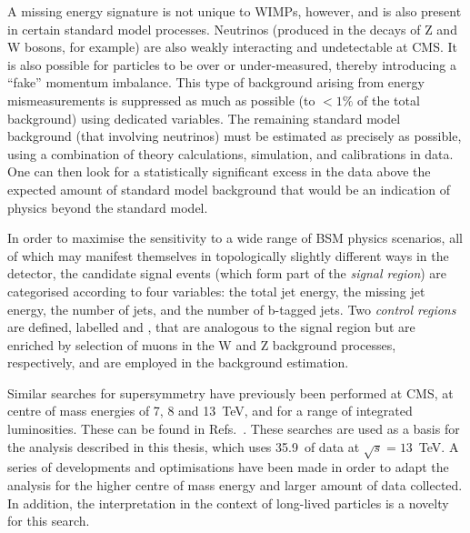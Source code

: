 A missing energy signature is not unique to WIMPs, however, and is also present 
in certain standard model processes. Neutrinos (produced in the decays of Z and 
W bosons, for example) are also weakly interacting and undetectable at CMS. It 
is also possible for particles to be over or under-measured, thereby 
introducing a ``fake'' momentum imbalance. This type of background arising from 
energy mismeasurements is suppressed as much as possible (to $<1\%$ of the 
total background) using dedicated variables. %
The remaining standard 
model background (that involving neutrinos) must be estimated as precisely as 
possible, using a combination of theory calculations, simulation, and 
calibrations in data. %
One can then look for a 
statistically significant excess in the data above the expected amount of 
standard model background that would be an indication of %
physics beyond the standard model. %

In order to maximise the sensitivity to a wide range of BSM physics %
scenarios, 
all of which may manifest themselves in topologically slightly different ways 
in the detector, the candidate signal events (which form part of the 
\textit{signal region}) are categorised according to four variables: the total 
jet energy, the missing jet energy, the number of jets, and the number of 
b-tagged jets. %
Two \textit{control regions} are defined, labelled \mj and 
\mmj, that are analogous to the signal region but are enriched by 
selection of muons in the W and Z background processes, respectively, and are 
employed in the background estimation.%

Similar searches for supersymmetry have previously been performed %
at CMS, at centre of mass energies of 7, 8 and 13~TeV, and for a range of 
integrated luminosities. These can be found in 
Refs.~\cite{alphat1,alphat2,alphat3,alphat4,alphat5}. These 
searches are used as a basis for the analysis described in this thesis, which 
uses 35.9~\ifb of data at $\sqrt{s}=13$~TeV. A 
series of developments and optimisations have been made in order to adapt the 
analysis for the higher centre of mass energy and larger amount of data 
collected. In addition, the interpretation in the context of %
long-lived particles %
is a novelty for this search.

